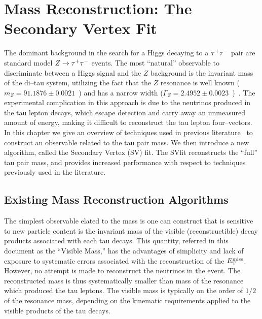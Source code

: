 \ifx\master\undefined\fi
%
\newcommand{\mtau}{m_{\tau}}
\newcommand{\mnus}{m_{\nu\nu}}
\newcommand{\mvis}{m_{vis}}
%
\chapter{Mass Reconstruction: The Secondary Vertex Fit}
\label{ch:svfit}
%
The dominant background in the search for a Higgs decaying to a $\tau^+\tau^-$ pair are 
standard model $\mbox{\ensuremath{Z\to\tau^+\tau^-}}$ events.  The most ``natural'' observable to discriminate
between a Higgs signal and the $Z$ background is the invariant mass of the
di--tau system, utilizing the fact that the $Z$ resonance is well known ($m_{Z}
= 91.1876 \pm 0.0021$~\GeVcc) and has a narrow width ($\Gamma_{Z} = 2.4952 \pm
0.0023$~\GeV)~\cite{PDG}.  The experimental complication in this approach is due
to the neutrinos produced in the tau lepton decays, which escape detection and
carry away an unmeasured amount of energy, making it difficult to
reconstruct the tau lepton four--vectors.  In this chapter we give an overview
of techniques used in previous literature~\cite{Rainwater:1998kj,CDFMSSMHiggs, 
CMS-PTDRII} to construct an observable related to the tau pair mass.  We then
introduce a new algorithm, called the Secondary Vertex (SV) fit.  The SVfit
reconstructs the ``full'' tau pair mass, and provides increased performance with
respect to techniques previously used in the literature.
%
\section{Existing Mass Reconstruction Algorithms}
%
The simplest observable elated to the \TT mass is one can construct that is
sensitive to new particle content is the invariant mass of the visible
(reconstructible) decay products associated with each tau decays.  This
quantity, referred in this document as the ``Visible Mass,'' has the advantages
of simplicity and lack of exposure to systematic errors associated with the
reconstruction of the $E_{\mathrm{T}}^{\text{miss}}$.  However, no attempt is made to reconstruct the
neutrinos in the event.  The reconstructed mass is thus systematically smaller
than mass of the resonance which produced the tau leptons.  The visible mass is
typically on the order of $1/2$ of the resonance mass, depending on the
kinematic requirements applied to the visible products of the tau decays. 

